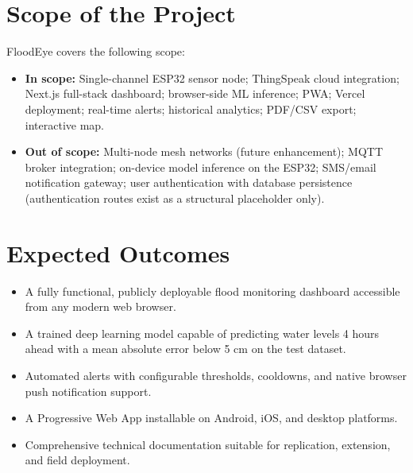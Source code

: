 \section{Scope of the Project}

FloodEye covers the following scope:

\begin{itemize}[leftmargin=1.5em]
  \item \textbf{In scope:} Single-channel ESP32 sensor node; ThingSpeak cloud integration; Next.js full-stack dashboard; browser-side ML inference; PWA; Vercel deployment; real-time alerts; historical analytics; PDF/CSV export; interactive map.
  \item \textbf{Out of scope:} Multi-node mesh networks (future enhancement); MQTT broker integration; on-device model inference on the ESP32; SMS/email notification gateway; user authentication with database persistence (authentication routes exist as a structural placeholder only).
\end{itemize}

\section{Expected Outcomes}

\begin{itemize}[leftmargin=1.5em]
  \item A fully functional, publicly deployable flood monitoring dashboard accessible from any modern web browser.
  \item A trained deep learning model capable of predicting water levels 4 hours ahead with a mean absolute error below 5 cm on the test dataset.
  \item Automated alerts with configurable thresholds, cooldowns, and native browser push notification support.
  \item A Progressive Web App installable on Android, iOS, and desktop platforms.
  \item Comprehensive technical documentation suitable for replication, extension, and field deployment.
\end{itemize}
